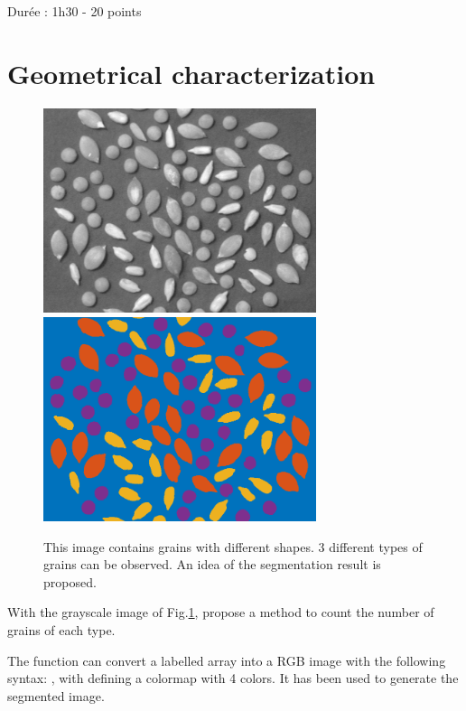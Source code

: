 
\noindent
Durée : 1h30 - 20 points\\


\section{Geometrical characterization}

\begin{figure}[htbp]
 \centering
 \includegraphics[width=8cm]{seeds.png}
 \includegraphics[width=8cm]{segmentation.png}
 \caption{This image contains grains with different shapes. 3 different types of grains can be observed. An idea of the segmentation result is proposed.}
 \label{fig:exam_2016:seeds}
\end{figure}

\begin{qbox}
With the grayscale image of Fig.\ref{fig:exam_2016:seeds}, propose a method to count the number of grains of each type.
\end{qbox}

\begin{mcomment}
\begin{mremark}
The function  can convert a labelled array into a RGB image with the following syntax: , 
with  defining a colormap with 4 colors. It has been used to generate the segmented image.
\end{mremark}
\end{mcomment}

